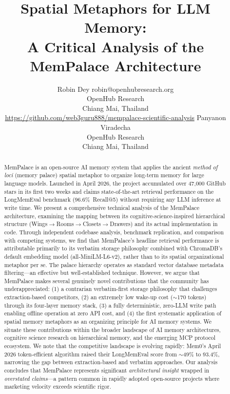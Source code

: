\documentclass[twoside,11pt]{article}
\title{Spatial Metaphors for LLM Memory:\\
       A Critical Analysis of the MemPalace Architecture}
\author{\name Robin Dey \email robin@openhubresearch.org \\
        \addr OpenHub Research \\
        Chiang Mai, Thailand \\
        \url{https://github.com/web3guru888/mempalace-scientific-analysis}
        \AND
        \name Panyanon Viradecha \\
        \addr OpenHub Research \\
        Chiang Mai, Thailand}
\begin{document}
\maketitle

\begin{abstract}%
MemPalace is an open-source AI memory system that applies the ancient
\emph{method of loci} (memory palace) spatial metaphor to organize long-term
memory for large language models.  Launched in April 2026, the project
accumulated over 47{,}000 GitHub stars in its first two weeks and claims
state-of-the-art retrieval performance on the LongMemEval benchmark
(96.6\%\ Recall@5) without requiring any LLM inference at write time.  We
present a comprehensive technical analysis of the MemPalace architecture,
examining the mapping between its cognitive-science-inspired hierarchical
structure (Wings$\to$Rooms$\to$Closets$\to$Drawers) and its actual
implementation in code.  Through independent codebase analysis, benchmark
replication, and comparison with competing systems, we find that MemPalace's
headline retrieval performance is attributable primarily to its verbatim
storage philosophy combined with ChromaDB's default embedding model
(all-MiniLM-L6-v2), rather than to its spatial organizational metaphor per
se.  The palace hierarchy operates as standard vector database metadata
filtering---an effective but well-established technique.  However, we argue
that MemPalace makes several genuinely novel contributions that the community
has underappreciated: (1) a contrarian verbatim-first storage philosophy that
challenges extraction-based competitors, (2) an extremely low wake-up cost
($\sim$170 tokens) through its four-layer memory stack, (3) a fully
deterministic, zero-LLM write path enabling offline operation at zero API
cost, and (4) the first systematic application of spatial memory metaphors as
an organizing principle for AI memory systems.  We situate these contributions
within the broader landscape of AI memory architectures, cognitive science
research on hierarchical memory, and the emerging MCP protocol ecosystem.  We
note that the competitive landscape is evolving rapidly: Mem0's April 2026
token-efficient algorithm raised their LongMemEval score from $\sim$49\% to
93.4\%, narrowing the gap between extraction-based and verbatim approaches.
Our analysis concludes that MemPalace represents significant
\emph{architectural insight} wrapped in \emph{overstated claims}---a pattern
common in rapidly adopted open-source projects where marketing velocity
exceeds scientific rigor.
\end{abstract}
\end{document}
